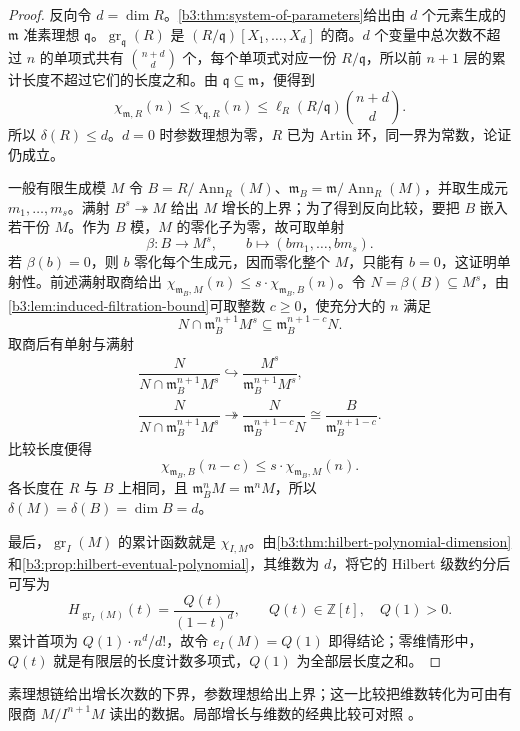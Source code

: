 \begin{proof}
	反向令 \(d=\dim R\)。\cref{b3:thm:system-of-parameters}给出由 \(d\) 个元素生成的 \(\mathfrak m\) 准素理想 \(\mathfrak q\)。\(\operatorname{gr}_{\mathfrak q}(R)\) 是 \((R/\mathfrak q)[X_1,\ldots,X_d]\) 的商。\(d\) 个变量中总次数不超过 \(n\) 的单项式共有 \(\binom{n+d}{d}\) 个，每个单项式对应一份 \(R/\mathfrak q\)，所以前 \(n+1\) 层的累计长度不超过它们的长度之和。由 \(\mathfrak q\subseteq\mathfrak m\)，便得到
	\[
		\chi_{\mathfrak m,R}(n)\le\chi_{\mathfrak q,R}(n) \le\ell_R(R/\mathfrak q)\binom{n+d}{d}.
	\]
	所以 \(\delta(R)\le d\)。\(d=0\) 时参数理想为零，\(R\) 已为 Artin 环，同一界为常数，论证仍成立。

	一般有限生成模 \(M\) 令 \(B=R/\operatorname{Ann}_R(M)\)、\(\mathfrak m_B=\mathfrak m/\operatorname{Ann}_R(M)\)，并取生成元 \(m_1,\ldots,m_s\)。满射 \(B^s\twoheadrightarrow M\) 给出 \(M\) 增长的上界；为了得到反向比较，要把 \(B\) 嵌入若干份 \(M\)。作为 \(B\) 模，\(M\) 的零化子为零，故可取单射
	\[
		\beta:B\longrightarrow M^s,\qquad b\longmapsto(bm_1,\ldots,bm_s).
	\]
	若 \(\beta(b)=0\)，则 \(b\) 零化每个生成元，因而零化整个 \(M\)，只能有 \(b=0\)，这证明单射性。前述满射取商给出 \(\chi_{\mathfrak m_B,M}(n)\le s\cdot\chi_{\mathfrak m_B,B}(n)\)。令 \(N=\beta(B)\subseteq M^s\)，由\cref{b3:lem:induced-filtration-bound}可取整数 \(c\ge0\)，使充分大的 \(n\) 满足
	\[
		N\cap\mathfrak m_B^{n+1}M^s\subseteq\mathfrak m_B^{n+1-c}N.
	\]
	取商后有单射与满射
	\[
		\begin{gathered}
			\dfrac{N}{N\cap\mathfrak m_B^{n+1}M^s} \hookrightarrow\dfrac{M^s}{\mathfrak m_B^{n+1}M^s},\\[3pt]
			\dfrac{N}{N\cap\mathfrak m_B^{n+1}M^s} \twoheadrightarrow\dfrac{N}{\mathfrak m_B^{n+1-c}N} \cong\dfrac{B}{\mathfrak m_B^{n+1-c}}.
		\end{gathered}
	\]
	比较长度便得
	\[
		\chi_{\mathfrak m_B,B}(n-c)\le s\cdot\chi_{\mathfrak m_B,M}(n).
	\]
	各长度在 \(R\) 与 \(B\) 上相同，且 \(\mathfrak m_B^nM=\mathfrak m^nM\)，所以 \(\delta(M)=\delta(B)=\dim B=d\)。

	最后，\(\operatorname{gr}_I(M)\) 的累计函数就是 \(\chi_{I,M}\)。由\cref{b3:thm:hilbert-polynomial-dimension}和\cref{b3:prop:hilbert-eventual-polynomial}，其维数为 \(d\)，将它的 Hilbert 级数约分后可写为
	\[
		H_{\operatorname{gr}_I(M)}(t)=\frac{Q(t)}{(1-t)^d}, \qquad Q(t)\in\mathbb Z[t],\quad Q(1)>0.
	\]
	累计首项为 \(Q(1)\cdot n^d/d!\)，故令 \(e_I(M)=Q(1)\) 即得结论；零维情形中，\(Q(t)\) 就是有限层的长度计数多项式，\(Q(1)\) 为全部层长度之和。
\end{proof}

素理想链给出增长次数的下界，参数理想给出上界；这一比较把维数转化为可由有限商 \(M/I^{n+1}M\) 读出的数据。局部增长与维数的经典比较可对照 \cite[\S13, Theorems 13.3--13.4, pp. 98--100]{Matsumura1989CommutativeRingTheory}。

